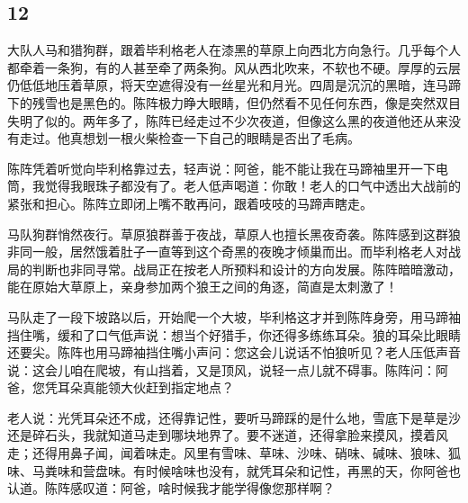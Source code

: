 \subsection*{12}


\par 大队人马和猎狗群，跟着毕利格老人在漆黑的草原上向西北方向急行。几乎每个人都牵着一条狗，有的人甚至牵了两条狗。风从西北吹来，不软也不硬。厚厚的云层仍低低地压着草原，将天空遮得没有一丝星光和月光。四周是沉沉的黑暗，连马蹄下的残雪也是黑色的。陈阵极力睁大眼睛，但仍然看不见任何东西，像是突然双目失明了似的。两年多了，陈阵已经走过不少次夜道，但像这么黑的夜道他还从来没有走过。他真想划一根火柴检查一下自己的眼睛是否出了毛病。
\par 陈阵凭着听觉向毕利格靠过去，轻声说：阿爸，能不能让我在马蹄袖里开一下电筒，我觉得我眼珠子都没有了。老人低声喝道：你敢！老人的口气中透出大战前的紧张和担心。陈阵立即闭上嘴不敢再问，跟着吱吱的马蹄声瞎走。
\par 马队狗群悄然夜行。草原狼群善于夜战，草原人也擅长黑夜奇袭。陈阵感到这群狼非同一般，居然饿着肚子一直等到这个奇黑的夜晚才倾巢而出。而毕利格老人对战局的判断也非同寻常。战局正在按老人所预料和设计的方向发展。陈阵暗暗激动，能在原始大草原上，亲身参加两个狼王之间的角逐，简直是太刺激了！
\par 马队走了一段下坡路以后，开始爬一个大坡，毕利格这才并到陈阵身旁，用马蹄袖挡住嘴，缓和了口气低声说：想当个好猎手，你还得多练练耳朵。狼的耳朵比眼睛还要尖。陈阵也用马蹄袖挡住嘴小声问：您这会儿说话不怕狼听见？老人压低声音说：这会儿咱在爬坡，有山挡着，又是顶风，说轻一点儿就不碍事。陈阵问：阿爸，您凭耳朵真能领大伙赶到指定地点？
\par 老人说：光凭耳朵还不成，还得靠记性，要听马蹄踩的是什么地，雪底下是草是沙还是碎石头，我就知道马走到哪块地界了。要不迷道，还得拿脸来摸风，摸着风走；还得用鼻子闻，闻着味走。风里有雪味、草味、沙味、硝味、碱味、狼味、狐味、马粪味和营盘味。有时候啥味也没有，就凭耳朵和记性，再黑的天，你阿爸也认道。陈阵感叹道：阿爸，啥时候我才能学得像您那样啊？
